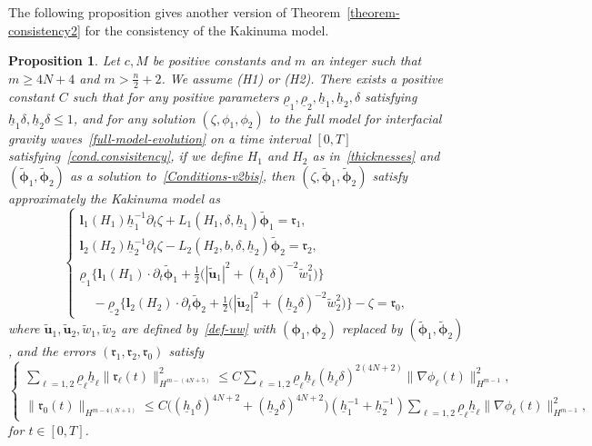\documentclass[11pt,leqno]{article}
\newtheorem{proposition}[theorem]{\bf Proposition}
\numberwithin{equation}{section}
\numberwithin{figure}{section}
\begin{document}
The following proposition gives another version of Theorem~\ref{theorem-consistency2} for the consistency 
of the Kakinuma model. 


\begin{proposition}\label{prop-consistency}
Let $c, M$ be positive constants and $m$ an integer such that $m \geq 4N+4$ and $m>\frac{n}{2}+2$. 
We assume {\rm (H1)} or {\rm (H2)}. 
There exists a positive constant $C$ such that for any positive parameters 
$\underline{\rho}_1, \underline{\rho}_2, \underline{h}_1, \underline{h}_2, \delta$ satisfying 
$\underline{h}_1\delta, \underline{h}_2\delta \leq 1$, and for any 
solution $(\zeta,\phi_1,\phi_2)$ to the full model for interfacial gravity waves~\eqref{full-model-evolution} 
on a time interval $[0,T]$ satisfying~\eqref{cond.consisitency}, 
if we define $H_1$ and $H_2$ as in~\eqref{thicknesses} and $(\tilde{\bm{\phi}}_1,\tilde{\bm{\phi}}_2)$ 
as a solution to~\eqref{Conditions-v2bis}, 
then $(\zeta,\tilde{\bm{\phi}}_1,\tilde{\bm{\phi}}_2)$ satisfy approximately the Kakinuma model as 
%
\begin{equation}\label{app-Kakinuma}
\begin{cases}
 \displaystyle
 {\bm l}_1(H_1)\underline{h}_1^{-1}\partial_t\zeta + L_1(H_1,\delta,\underline{h}_1)\tilde{\bm{\phi}}_1
  = \bm{\mathfrak{r}}_1, \\
 \displaystyle
 {\bm l}_2(H_2)\underline{h}_2^{-1}\partial_t\zeta - L_2(H_2,b,\delta,\underline{h}_2)\tilde{\bm{\phi}}_2
  = \bm{\mathfrak{r}}_2, \\
 \underline{\rho}_1\bigl\{ {\bm l}_1(H_1) \cdot \partial_t\tilde{\bm{\phi}}_1 
   + \frac12\bigl( |\tilde{\bm{u}}_1|^2 + (\underline{h}_1\delta)^{-2} \tilde{w}_1^2 \bigr) \bigr\} \\
 \quad
 - \underline{\rho}_2\bigl\{ {\bm l}_2(H_2) \cdot \partial_t\tilde{\bm{\phi}}_2 
  + \frac12\bigl( |\tilde{\bm{u}}_2|^2 +  (\underline{h}_2\delta)^{-2} \tilde{w}_2^2 \bigr) \bigr\} 
 - \zeta = \mathfrak{r}_0,
\end{cases}
\end{equation}
%
where $\tilde{\bm{u}}_1, \tilde{\bm{u}}_2, \tilde{w}_1, \tilde{w}_2$ are defined by~\eqref{def-uw} with 
$(\bm{\phi}_1,\bm{\phi}_2)$ replaced by $(\tilde{\bm{\phi}}_1,\tilde{\bm{\phi}}_2)$, 
and the errors $(\bm{\mathfrak{r}}_1,\bm{\mathfrak{r}}_2,\mathfrak{r}_0)$ satisfy 
%
\begin{equation}\label{error-estimate2}
\begin{cases}
 \displaystyle
 \sum_{\ell=1,2}\underline{\rho}_\ell \underline{h}_\ell \|\bm{\mathfrak{r}}_\ell(t)\|_{H^{m-(4N+5)}}^2
  \leq C\sum_{\ell=1,2}\underline{\rho}_\ell \underline{h}_\ell
   (\underline{h}_\ell\delta)^{2(4N+2)}\|\nabla\phi_\ell(t)\|_{H^{m-1}}^2, \\
 \displaystyle
 \|\mathfrak{r}_0(t)\|_{H^{m-4(N+1)}} \leq 
  C
  \bigl( (\underline{h}_1\delta)^{4N+2}+(\underline{h}_2\delta)^{4N+2}\bigr)
  (\underline{h}_1^{-1}+\underline{h}_2^{-1})
  \sum_{\ell=1,2}\underline{\rho}_\ell \underline{h}_\ell  \|\nabla\phi_\ell(t)\|_{H^{m-1}}^2,
\end{cases}
\end{equation}
%
for $t\in[0,T]$. 
\end{proposition}
\end{document}
